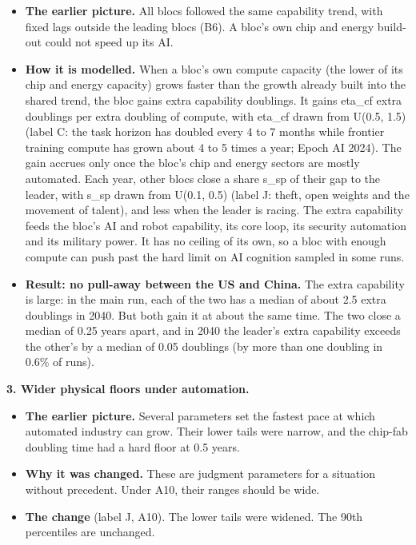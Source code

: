 \documentclass[
  10pt,
]{article}
\providecommand{\tightlist}{%
  \setlength{\itemsep}{0pt}\setlength{\parskip}{0pt}}
\begin{document}
\begin{itemize}
\tightlist
\item
  \textbf{The earlier picture.} All blocs followed the same capability trend, with fixed lags
  outside the leading blocs (B6). A bloc's own chip and energy build-out could not speed up its AI.
\item
  \textbf{How it is modelled.} When a bloc's own compute capacity (the lower of its chip and energy
  capacity) grows faster than the growth already built into the shared trend, the bloc gains extra
  capability doublings. It gains eta\_cf extra doublings per extra doubling of compute, with eta\_cf
  drawn from U(0.5, 1.5) (label C: the task horizon has doubled every 4 to 7 months while frontier
  training compute has grown about 4 to 5 times a year; Epoch AI 2024). The gain accrues only once
  the bloc's chip and energy sectors are mostly automated. Each year, other blocs close a share
  s\_sp of their gap to the leader, with s\_sp drawn from U(0.1, 0.5) (label J: theft, open weights
  and the movement of talent), and less when the leader is racing. The extra capability feeds the
  bloc's AI and robot capability, its core loop, its security automation and its military power. It
  has no ceiling of its own, so a bloc with enough compute can push past the hard limit on AI
  cognition sampled in some runs.
\item
  \textbf{Result: no pull-away between the US and China.} The extra capability is large: in the main
  run, each of the two has a median of about 2.5 extra doublings in 2040. But both gain it at about
  the same time. The two close a median of 0.25 years apart, and in 2040 the leader's extra
  capability exceeds the other's by a median of 0.05 doublings (by more than one doubling in 0.6\%
  of runs).
\end{itemize}

\textbf{3. Wider physical floors under automation.}

\begin{itemize}
\tightlist
\item
  \textbf{The earlier picture.} Several parameters set the fastest pace at which automated industry
  can grow. Their lower tails were narrow, and the chip-fab doubling time had a hard floor at 0.5
  years.
\item
  \textbf{Why it was changed.} These are judgment parameters for a situation without precedent.
  Under A10, their ranges should be wide.
\item
  \textbf{The change} (label J, A10). The lower tails were widened. The 90th percentiles are
  unchanged.
\end{itemize}
\end{document}
